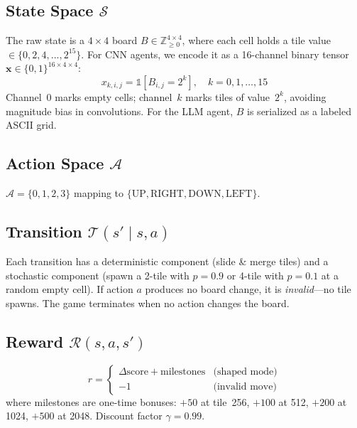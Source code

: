 \documentclass[conference, 10pt]{IEEEtran}
\begin{document}
\subsection{State Space $\mathcal{S}$}
The raw state is a $4{\times}4$ board $B\!\in\!\mathbb{Z}_{\geq 0}^{4\times 4}$, where each cell holds a tile value $\in\{0,2,4,...,2^{15}\}$.  For CNN agents, we encode it as a 16-channel binary tensor $\mathbf{x}\!\in\!\{0,1\}^{16\times 4\times 4}$:
\begin{equation}
    x_{k,i,j}=\mathbb{1}\!\left[B_{i,j}=2^{k}\right],\quad k=0,1,\dots,15
    \label{eq:obs}
\end{equation}
Channel~0 marks empty cells; channel~$k$ marks tiles of value~$2^k$, avoiding magnitude bias in convolutions.  For the LLM agent, $B$ is serialized as a labeled ASCII grid.

\subsection{Action Space $\mathcal{A}$}
$\mathcal{A}=\{0,1,2,3\}$ mapping to $\{\text{UP},\text{RIGHT},\text{DOWN},\text{LEFT}\}$.

\subsection{Transition $\mathcal{T}(s'\mid s,a)$}
Each transition has a deterministic component (slide \& merge tiles) and a stochastic component (spawn a 2-tile with $p{=}0.9$ or 4-tile with $p{=}0.1$ at a random empty cell).  If action $a$ produces no board change, it is \emph{invalid}---no tile spawns.  The game terminates when no action changes the board.

\subsection{Reward $\mathcal{R}(s,a,s')$}
\begin{equation}
r = \begin{cases}
\Delta\text{score} + \text{milestones} & \text{(shaped mode)} \\
-1 & \text{(invalid move)}
\end{cases}
\end{equation}
where milestones are one-time bonuses: $+50$ at tile~256, $+100$ at 512, $+200$ at 1024, $+500$ at 2048.  Discount factor $\gamma{=}0.99$.

\vspace{2pt}
\noindent{}
\end{document}
